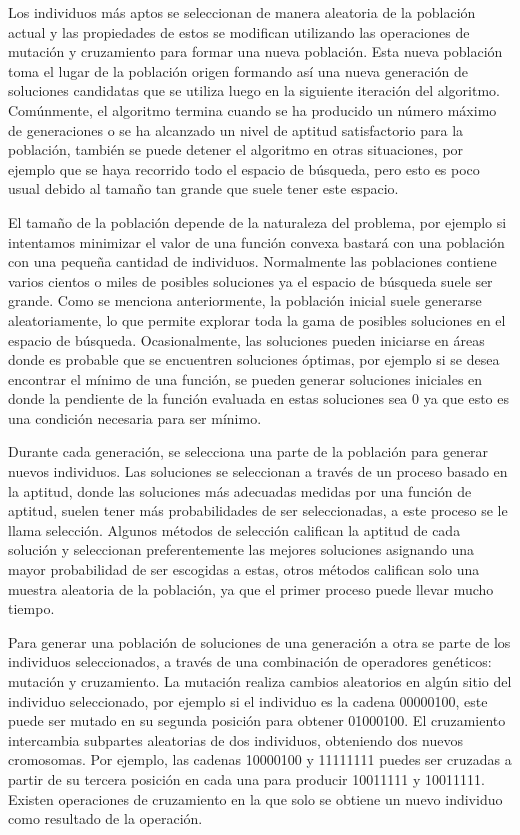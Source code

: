 Los individuos más aptos se seleccionan de manera aleatoria de la población actual y las propiedades de estos se modifican utilizando las operaciones de mutación y cruzamiento para formar una nueva población. Esta nueva población toma el lugar de la población origen formando así una nueva generación de soluciones candidatas que se utiliza luego en la siguiente iteración del algoritmo. Comúnmente, el algoritmo termina cuando se ha producido un número máximo de generaciones o se ha alcanzado un nivel de aptitud satisfactorio para la población, también se puede detener el algoritmo en otras situaciones, por ejemplo que se haya recorrido todo el espacio de búsqueda, pero esto es poco usual debido al tamaño tan grande que suele tener este espacio.

El tamaño de la población depende de la naturaleza del problema, por ejemplo si intentamos minimizar el valor de una función convexa bastará con una población con una pequeña cantidad de individuos. Normalmente las poblaciones contiene varios cientos o miles de posibles soluciones ya el espacio de búsqueda suele ser grande. Como se menciona anteriormente, la población inicial suele generarse aleatoriamente, lo que permite explorar toda la gama de posibles soluciones en el espacio de búsqueda. Ocasionalmente, las soluciones pueden iniciarse en áreas donde es probable que se encuentren soluciones óptimas, por ejemplo si se desea encontrar el mínimo de una función, se pueden generar soluciones iniciales en donde la pendiente de la función evaluada en estas soluciones sea $0$ ya que esto es una condición necesaria para ser mínimo.

Durante cada generación, se selecciona una parte de la población para generar nuevos individuos. Las soluciones se seleccionan a través de un proceso basado en la aptitud, donde las soluciones más adecuadas medidas por una función de aptitud, suelen tener más probabilidades de ser seleccionadas, a este proceso se le llama selección. Algunos métodos de selección califican la aptitud de cada solución y seleccionan preferentemente las mejores soluciones asignando una mayor probabilidad de ser escogidas a estas, otros métodos califican solo una muestra aleatoria de la población, ya que el primer proceso puede llevar mucho tiempo.

Para generar una población de soluciones de una generación a otra se parte de los individuos seleccionados, a través de una combinación de operadores genéticos: mutación y cruzamiento. La mutación realiza cambios aleatorios en algún sitio del individuo seleccionado, por ejemplo si el individuo es la cadena 00000100, este puede ser mutado en su segunda posición para obtener 01000100. El cruzamiento intercambia subpartes aleatorias de dos individuos, obteniendo dos nuevos cromosomas. Por ejemplo, las cadenas 10000100 y 11111111 puedes ser cruzadas a partir de su tercera posición en cada una para producir 10011111 y 10011111. Existen operaciones de cruzamiento en la que solo se obtiene un nuevo individuo como resultado de la operación.

